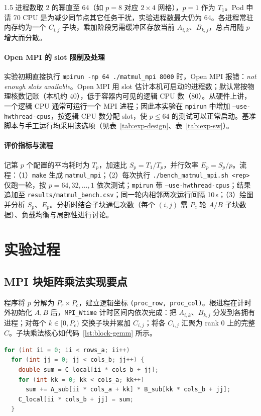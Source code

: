 \documentclass[zihao=-4]{ctexart}
\begin{document}
\begin{spacing}{1.5}
进程数取 2 的幂直至 64（如 \(p=8\) 对应 \(2\times4\) 网格），\(p=1\) 作为 \(T_1\)。Pod 申请 70 CPU 是为减少同节点其它任务干扰，实验进程数最大仍为 64。各进程常驻内存约为一个 \(C_{i,j}\) 子块，乘加阶段另需缓冲区存放当前 \(A_{i,k}\)、\(B_{k,j}\)，总占用随 \(p\) 增大而分散。

\paragraph{Open MPI 的 slot 限制及处理}
实验初期直接执行 \texttt{mpirun -np 64 ./matmul\_mpi 8000} 时，Open MPI 报错：\emph{not enough slots available}。Open MPI 用 slot 估计本机可启动的进程数；默认常按物理核数记账（本机约 40），低于容器内可见的逻辑 CPU 数（80）。从硬件上讲，一个逻辑 CPU 通常可运行一个 MPI 进程；因此本实验在 \texttt{mpirun} 中增加 \texttt{--use-hwthread-cpus}，按逻辑 CPU 数分配 slot，使 \(p\le 64\) 的测试可以正常启动。基准脚本与手工运行均采用该选项（见表~\ref{tab:exp-design}、表~\ref{tab:exp-sw}）。

\paragraph{评价指标与流程}
记第 \(p\) 个配置的平均耗时为 \(T_p\)，加速比 \(S_p=T_1/T_p\)，并行效率 \(E_p=S_p/p\)。流程：（1）\texttt{make} 生成 \texttt{matmul\_mpi}；（2）每次执行 \texttt{./bench\_matmul\_mpi.sh <rep>} 仅跑一轮，按 \(p=64,32,\ldots,1\) 依次测试；\texttt{mpirun} 带 \texttt{--use-hwthread-cpus}；结果追加至 \texttt{results/matmul\_bench.csv}；同一轮内相邻两次运行间隔 10\,s；（3）绘图并分析 \(S_p\)、\(E_p\)。分析时结合子块通信次数（每个 \((i,j)\) 需 \(P_c\) 轮 \(A/B\) 子块数据）、负载均衡与局部性进行讨论。

\section{实验过程}

\subsection{MPI 块矩阵乘法实现要点}
程序将 \(p\) 分解为 \(P_r\times P_c\)，建立逻辑坐标 \texttt{(proc\_row, proc\_col)}。根进程在计时外初始化 \(A,B\) 后，\texttt{MPI\_Wtime} 计时区间内依次完成：把 \(A_{i,k}\)、\(B_{k,j}\) 分发到各拥有进程；对每个 \(k\in[0,P_c)\) 交换子块并累加 \(C_{i,j}\)；将各 \(C_{i,j}\) 汇聚为 rank 0 上的完整 \(C\)。子块乘法核心如代码~\ref{lst:block-gemm} 所示。

\begin{lstlisting}[language=C,caption={子块乘加（节选）},label={lst:block-gemm}]
for (int ii = 0; ii < rows_a; ii++)
  for (int jj = 0; jj < cols_b; jj++) {
    double sum = C_local[ii * cols_b + jj];
    for (int kk = 0; kk < cols_a; kk++)
      sum += A_sub[ii * cols_a + kk] * B_sub[kk * cols_b + jj];
    C_local[ii * cols_b + jj] = sum;
  }
\end{lstlisting}


\end{spacing}
\end{document}
